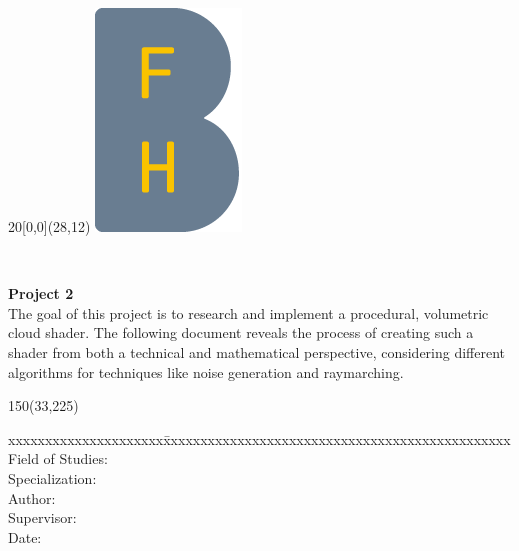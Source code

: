 
\begin{titlepage}

\setlength{\unitlength}{1mm}

\begin{textblock}{20}[0,0](28,12)
    \includegraphics[scale=1.0]{../img/BFH_Logo_B.png}
\end{textblock}

\begin{flushleft}

\vspace*{21mm}

\fontsize{26pt}{40pt}\selectfont
\textbf{\doctitle}	\\
\vspace{2mm}

\fontsize{16pt}{24pt}\selectfont\vspace{0.3em}
\docsubtitle
\vspace{5mm}

\fontsize{10pt}{12pt}\selectfont
\textbf{Project 2} \\

\fontsize{10pt}{12pt}\selectfont
The goal of this project is to research and implement a procedural, volumetric cloud shader. The following document reveals the process of creating such a shader from both a technical and mathematical perspective, considering different algorithms for techniques like noise generation and raymarching.
\begin{textblock}{150}(33,225)
\fontsize{10pt}{17pt}
\begin{tabbing}
xxxxxxxxxxxxxxxxxxxxx\=xxxxxxxxxxxxxxxxxxxxxxxxxxxxxxxxxxxxxxxxxxxxxxx \kill
Field of Studies:	\> \fieldofstudies	\\
Specialization:	    \> \specialisation	\\
Author:		        \> \docauthor \\
Supervisor:         \> \prof \\
Date:			    \> \versiondate \\
\end{tabbing}


\end{textblock}
\end{flushleft}
\end{titlepage}
